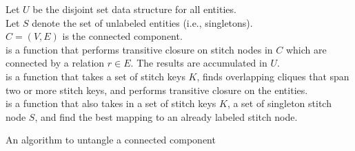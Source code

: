 \documentclass{bmcart}
\begin{document}
\begin{backmatter}
\begin{algorithm}[ht!]\label{algo:untangle}
\SetAlgoLined
\DontPrintSemicolon
Let $U$ be the disjoint set data structure for all entities.\\
Let $S$ denote the set of unlabeled entities (i.e., singletons).\\
$C=(V,E)$ is the connected component.\\
 is a function that performs transitive closure on
stitch nodes in $C$ which are connected by a relation $r\in E$. The results are
accumulated in $U$.\\
 is a function that takes a set of stitch keys
$K$, finds overlapping cliques that span two or more stitch keys,
and performs transitive closure on the entities.\\
 is a function that also takes in a set of
stitch keys $K$, a set of singleton stitch node $S$, and find the best
mapping to an already labeled stitch node.\\
\;
\;
\;
\;
\;
 \caption{An algorithm to untangle a connected component}
\end{algorithm}


%

\end{backmatter}
\end{document}
